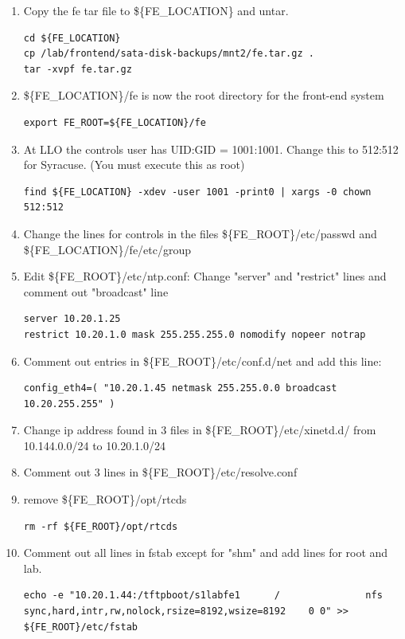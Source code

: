 \begin{enumerate}
    \item Copy the fe tar file to \$\{FE\_LOCATION\} and untar.
\begin{lstlisting}
cd ${FE_LOCATION}
cp /lab/frontend/sata-disk-backups/mnt2/fe.tar.gz .
tar -xvpf fe.tar.gz
\end{lstlisting}
    \item \$\{FE\_LOCATION\}/fe is now the root directory for the front-end system
\begin{lstlisting}
export FE_ROOT=${FE_LOCATION}/fe
\end{lstlisting}
    \item At LLO the controls user has UID:GID = 1001:1001. Change this to 512:512 for Syracuse. (You must execute this as root)
\begin{lstlisting}
find ${FE_LOCATION} -xdev -user 1001 -print0 | xargs -0 chown 512:512
\end{lstlisting}
    \item Change the lines for controls in the files \$\{FE\_ROOT\}/etc/passwd and \$\{FE\_LOCATION\}/fe/etc/group
    \item Edit \$\{FE\_ROOT\}/etc/ntp.conf: Change "server" and "restrict" lines and comment out "broadcast" line
\begin{lstlisting}
server 10.20.1.25
restrict 10.20.1.0 mask 255.255.255.0 nomodify nopeer notrap
\end{lstlisting}
    \item Comment out entries in \$\{FE\_ROOT\}/etc/conf.d/net and add this line:
\begin{lstlisting}
config_eth4=( "10.20.1.45 netmask 255.255.0.0 broadcast 10.20.255.255" )
\end{lstlisting}
    \item Change ip address found in 3 files in \$\{FE\_ROOT\}/etc/xinetd.d/ from 10.144.0.0/24 to 10.20.1.0/24
    \item Comment out 3 lines in \$\{FE\_ROOT\}/etc/resolve.conf
    \item remove \$\{FE\_ROOT\}/opt/rtcds
\begin{lstlisting}
rm -rf ${FE_ROOT}/opt/rtcds
\end{lstlisting}
    \item Comment out all lines in fstab except for "shm" and add lines for root and lab.
\begin{lstlisting}
echo -e "10.20.1.44:/tftpboot/s1labfe1      /               nfs     sync,hard,intr,rw,nolock,rsize=8192,wsize=8192    0 0" >> ${FE_ROOT}/etc/fstab

\end{lstlisting}
\end{enumerate}

